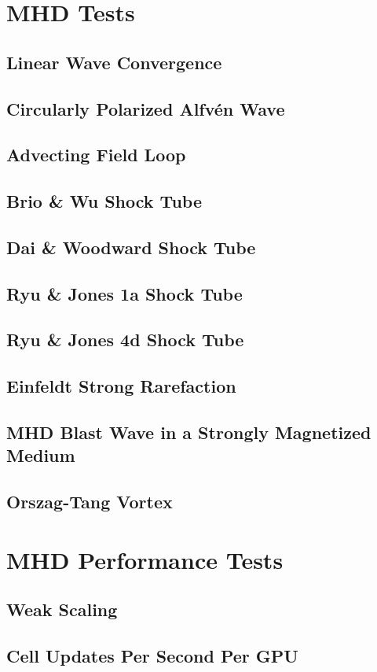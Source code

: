 \section{MHD Tests}
\label{sec:mhd-tests}

\subsection{Linear Wave Convergence}
\subsection{Circularly Polarized Alfv\'en Wave}
\subsection{Advecting Field Loop}
\subsection{Brio \& Wu Shock Tube}
\subsection{Dai \& Woodward Shock Tube}
\subsection{Ryu \& Jones 1a Shock Tube}
\subsection{Ryu \& Jones 4d Shock Tube}
\subsection{Einfeldt Strong Rarefaction}
\subsection{MHD Blast Wave in a Strongly Magnetized Medium}
\subsection{Orszag-Tang Vortex}


\section{MHD Performance Tests}
\label{sec:mhd-perf-tests}


\subsection{Weak Scaling}

\subsection{Cell Updates Per Second Per GPU}

